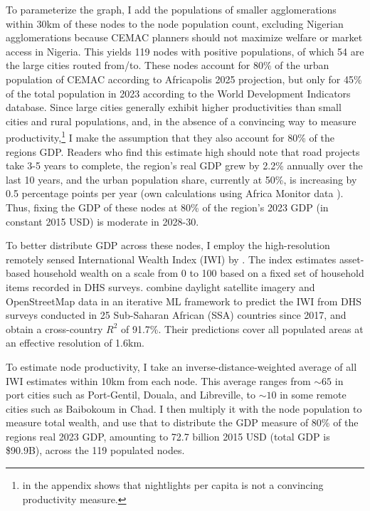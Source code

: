 \documentclass[a4paper]{article}
\begin{document}
To parameterize the graph, I add the populations of smaller agglomerations within 30km of these nodes to the node population count, excluding Nigerian agglomerations because CEMAC planners should not maximize welfare or market access in Nigeria. This yields 119 nodes with positive populations, of which 54 are the large cities routed from/to. These nodes account for 80\% of the urban population of CEMAC according to Africapolis 2025 projection, but only for 45\% of the total population in 2023 according to the World Development Indicators database. Since large cities generally exhibit higher productivities than small cities and rural populations, and, in the absence of a convincing way to measure productivity,\footnote{\citet{krantz2024optimal} in the appendix shows that nightlights per capita is not a convincing productivity measure. \vspace{-3mm}} I make the assumption that they also account for 80\% of the regions GDP. Readers who find this estimate high should note that road projects take 3-5 years to complete, the region's real GDP grew by 2.2\% annually over the last 10 years, and the urban population share, currently at 50\%, is increasing by 0.5 percentage points per year (own calculations using Africa Monitor data \citep{krantz2024africamonitor}). Thus, fixing the GDP of these nodes at 80\% of the region's 2023 GDP (in constant 2015 USD) is moderate in 2028-30.   \newline 

  To better distribute GDP across these nodes, I employ the high-resolution remotely sensed International Wealth Index (IWI) by \citet{lee2022high}. The index estimates asset-based household wealth on a scale from 0 to 100 based on a fixed set of household items recorded in DHS surveys. \citet{lee2022high} combine daylight satellite imagery and OpenStreetMap data in an iterative ML framework to predict the IWI from DHS surveys conducted in 25 Sub-Saharan African (SSA) countries since 2017, and obtain a cross-country $R^2$ of 91.7\%. Their predictions cover all populated areas at an effective resolution of 1.6km. \newline 
  
  To estimate node productivity, I take an inverse-distance-weighted average of all IWI estimates within 10km from each node. This average ranges from $\sim 65$ in port cities such as Port-Gentil, Douala, and Libreville, to $\sim 10$ in some remote cities such as Baibokoum in Chad. I then multiply it with the node population to measure total wealth, and use that to distribute the GDP measure of 80\% of the regions real 2023 GDP, amounting to 72.7 billion 2015 USD (total GDP is \$90.9B), across the 119 populated nodes. 
  
\end{document}
